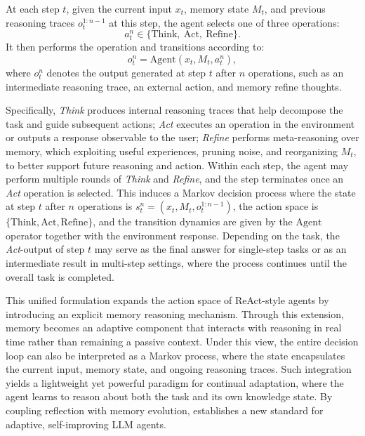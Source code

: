 At each step $t$, given the current input $x_t$, memory state $M_t$, and previous reasoning traces $o^{1:n-1}_t$ at this step,  the agent selects one of three operations:
\[
a_t^n \in \{\text{Think},~\text{Act},~\text{Refine}\}.
\]
It then performs the operation and transitions according to:
\[
o_t^n = \text{Agent}(x_t, M_t, a_t^n),
\]
where $o_t^n$ denotes the output generated at step $t$ after $n$ operations, such as an intermediate reasoning trace, an external action, and memory refine thoughts.


Specifically,  
\emph{Think} produces internal reasoning traces that help decompose the task and guide subsequent actions;  
\emph{Act} executes an operation in the environment or outputs a response observable to the user;  
\emph{Refine} performs meta-reasoning over memory, which exploiting useful experiences, pruning noise, and reorganizing $M_t$, to better support future reasoning and action. Within each step, the agent may perform multiple rounds of \emph{Think} and \emph{Refine}, and the step terminates once an \emph{Act} operation is selected.  
This induces a Markov decision process where the state at step \(t\) after $n$ operations is \(s_t^n = (x_t, M_t, o^{1:n-1}_t)\), the action space is \(\{\text{Think}, \text{Act}, \text{Refine}\}\), and the transition dynamics are given by the \(\text{Agent}\) operator together with the environment response.  
Depending on the task, the \textit{Act}-output of step \(t\) may serve as the final answer for single-step tasks or as an intermediate result in multi-step settings, where the process continues until the overall task is completed.


This unified formulation expands the action space of ReAct-style \citep{yao2022react} agents by introducing an explicit memory reasoning mechanism. 
Through this extension, memory becomes an adaptive component that interacts with reasoning in real time rather than remaining a passive context. Under this view, the entire decision loop can also be interpreted as a Markov process, where the state encapsulates the current input, memory state, and ongoing reasoning traces.
Such integration yields a lightweight yet powerful paradigm for continual adaptation, where the agent learns to reason about both the task and its own knowledge state. 
By coupling reflection with memory evolution, \alg establishes a new standard for adaptive, self-improving LLM agents.







